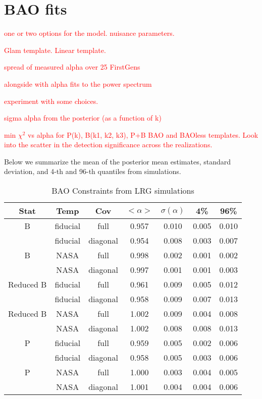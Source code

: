 \section{BAO fits}
\label{sec:fits}

\textcolor{red}{one or two options for the model. nuisance parameters.}

\textcolor{red}{Glam template. Linear template.}

\textcolor{red}{spread of measured alpha over 25 FirstGens}

\textcolor{red}{alongside with alpha fits to the power spectrum}

\textcolor{red}{experiment with some choices.}

\textcolor{red}{sigma alpha from the posterior (as a function of k)}

\textcolor{red}{min $\chi^{2}$ vs alpha for P(k), B(k1, k2, k3), P+B BAO and BAOless templates. Look into the scatter in the detection significance across the realizations.}




Below we summarize the mean of the posterior mean estimates, standard deviation, and 4-th and 96-th quantiles from simulations. 

\begin{table}
\caption{‌BAO Constraints from LRG simulations}
\begin{center}
\begin{tabular}{ccccccc}
Stat & Temp & Cov &$< \alpha >$ & $\sigma(\alpha) $ & 4\%&96\%\\
\hline
                            B  &   fiducial & full & 0.957 & 0.010& 0.005 & 0.010\\ 
 &   fiducial & diagonal & 0.954 & 0.008 &0.003 &0.007\\ 
\hline
                            B  &       NASA & full & 0.998 & 0.002& 0.001 & 0.002\\ 
 &       NASA & diagonal & 0.997 & 0.001 &0.001 &0.003\\ 
\hline
                    Reduced B  &   fiducial & full & 0.961 & 0.009& 0.005 & 0.012\\ 
 &   fiducial & diagonal & 0.958 & 0.009 &0.007 &0.013\\ 
\hline
                    Reduced B  &       NASA & full & 1.002 & 0.009& 0.004 & 0.008\\ 
 &       NASA & diagonal & 1.002 & 0.008 &0.008 &0.013\\ 
\hline
                            P  &   fiducial & full & 0.959 & 0.005& 0.002 & 0.006\\ 
 &   fiducial & diagonal & 0.958 & 0.005 &0.003 &0.006\\ 
\hline
                            P  &       NASA & full & 1.000 & 0.003& 0.004 & 0.005\\ 
 &       NASA & diagonal & 1.001 & 0.004 &0.004 &0.006
\end{tabular}
\end{center}
\label{tab:lrg}
\end{table}


